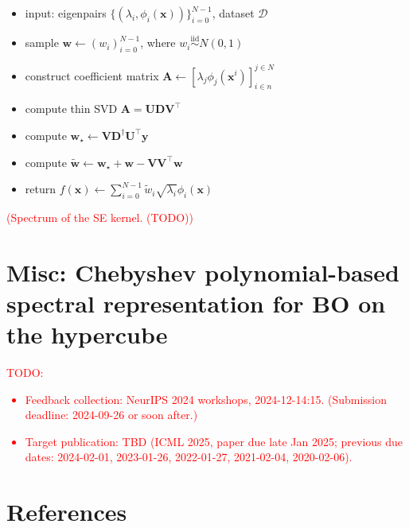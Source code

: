 \documentclass{article}
\newcommand{\todo}[1]{\textcolor{red}{(#1)}}
\begin{document}
\begin{itemize}

\item
  input: eigenpairs $\{(\lambda_i, \phi_i(\mathbf{x}))\}_{i=0}^{N-1}$,
  dataset $\mathcal{D}$
\item
  sample $\mathbf{w} \gets (w_i)_{i=0}^{N-1}$, where
  $w_i \overset{\text{iid}}{\sim} N(0,1)$
\item
  construct coefficient matrix
  $\mathbf{A} \gets [\lambda_j \phi_j(\mathbf{x}^i)]_{i \in n}^{j \in N}$
\item
  compute thin SVD
  $\mathbf{A} = \mathbf{U} \mathbf{D} \mathbf{V}^\intercal$
\item
  compute
  $\mathbf{w}_\star \gets \mathbf{V} \mathbf{D}^\dagger \mathbf{U}^\intercal \mathbf{y}$
\item
  compute
  $\widetilde{\mathbf{w}} \gets \mathbf{w}_\star + \mathbf{w} - \mathbf{V} \mathbf{V}^\intercal \mathbf{w}$
\item
  return
  $f(\mathbf{x}) \gets \sum_{i=0}^{N-1} \widetilde{w}_i \sqrt{\lambda_i} \phi_i(\mathbf{x})$
\end{itemize}

\todo{Spectrum of the SE kernel. (TODO)}


\section{Misc: Chebyshev polynomial-based spectral representation for BO on the hypercube}

\textcolor{red}{TODO:
\begin{itemize}
\item
  Feedback collection: NeurIPS 2024 workshops, 2024-12-14:15.
  (Submission deadline: 2024-09-26 or soon after.)
\item
  Target publication: TBD (ICML 2025, paper due late Jan 2025; previous
  due dates: 2024-02-01, 2023-01-26, 2022-01-27, 2021-02-04,
  2020-02-06).
\end{itemize}
}



\section*{References}


\end{document}
